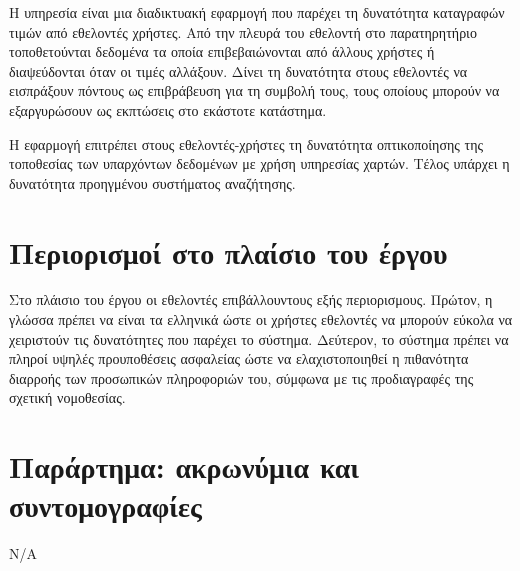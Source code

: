 \documentclass[a4paper,oneside, 12pt]{article}
\begin{document}
Η υπηρεσία είναι μια διαδικτυακή εφαρμογή που παρέχει τη δυνατότητα καταγραφών τιμών από εθελοντές χρήστες. Από την πλευρά του εθελοντή στο παρατηρητήριο  τοποθετούνται δεδομένα τα οποία επιβεβαιώνονται από άλλους χρήστες ή διαψεύδονται όταν οι τιμές αλλάξουν. Δίνει τη δυνατότητα στους εθελοντές να εισπράξουν πόντους ως επιβράβευση για τη συμβολή τους, τους οποίους μπορούν να εξαργυρώσουν ως εκπτώσεις στο εκάστοτε κατάστημα. 

Η εφαρμογή επιτρέπει στους εθελοντές-χρήστες τη δυνατότητα οπτικοποίησης της τοποθεσίας των υπαρχόντων δεδομένων με χρήση υπηρεσίας χαρτών. Τέλος υπάρχει η δυνατότητα προηγμένου συστήματος αναζήτησης.

\section{Περιορισμοί στο πλαίσιο του έργου}

Στο πλάισιο του έργου οι εθελοντές επιβάλλουντους εξής περιορισμους. Πρώτον, η γλώσσα πρέπει να είναι τα ελληνικά ώστε οι χρήστες εθελοντές να μπορούν εύκολα να χειριστούν τις δυνατότητες που παρέχει το σύστημα. Δεύτερον, το σύστημα πρέπει να πληροί υψηλές προυποθέσεις ασφαλείας ώστε να ελαχιστοποιηθεί η πιθανότητα διαρροής των προσωπικών πληροφοριών του, σύμφωνα με τις προδιαγραφές της σχετική νομοθεσίας.

\section{Παράρτημα: ακρωνύμια και συντομογραφίες}

Ν/Α
\end{document}
